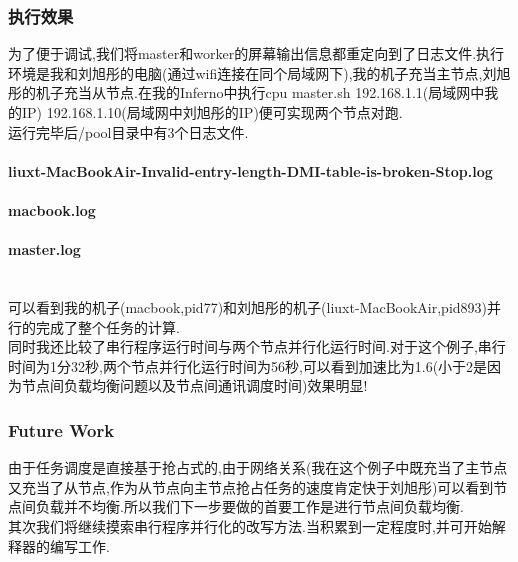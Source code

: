 \documentclass[paper=a4]{ctexart} %
\numberwithin{equation}{section} %
\numberwithin{figure}{section} %
\numberwithin{table}{section} %
\newcommand{\n}{\\\indent}
\begin{document}
\subsubsection{执行效果}
为了便于调试,我们将master和worker的屏幕输出信息都重定向到了日志文件.执行环境是我和刘旭彤的电脑(通过wifi连接在同个局域网下),我的机子充当主节点,刘旭彤的机子充当从节点.在我的Inferno中执行cpu master.sh 192.168.1.1(局域网中我的IP) 192.168.1.10(局域网中刘旭彤的IP)便可实现两个节点对跑. \n
运行完毕后/pool目录中有3个日志文件.\n
\paragraph{liuxt-MacBookAir-Invalid-entry-length-DMI-table-is-broken-Stop.log}

\paragraph{macbook.log} 

\paragraph{master.log}

~\n 可以看到我的机子(macbook,pid77)和刘旭彤的机子(liuxt-MacBookAir,pid893)并行的完成了整个任务的计算. \n
同时我还比较了串行程序运行时间与两个节点并行化运行时间.对于这个例子,串行时间为1分32秒,两个节点并行化运行时间为56秒,可以看到加速比为1.6(小于2是因为节点间负载均衡问题以及节点间通讯调度时间)效果明显!

\subsubsection{Future Work}
由于任务调度是直接基于抢占式的,由于网络关系(我在这个例子中既充当了主节点又充当了从节点,作为从节点向主节点抢占任务的速度肯定快于刘旭彤)可以看到节点间负载并不均衡.所以我们下一步要做的首要工作是进行节点间负载均衡.\n
其次我们将继续摸索串行程序并行化的改写方法.当积累到一定程度时,并可开始解释器的编写工作.
\end{document}
